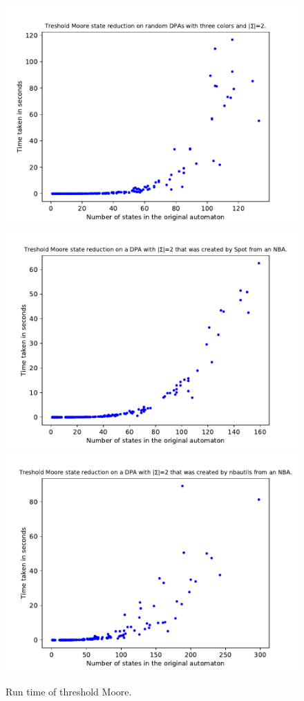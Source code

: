 \begin{figure}
	\centering
	\includegraphics[page=1,height=.3\textheight]{../data/analysis/threshold_moore/gendet_ap1.pdf} 
	\includegraphics[page=1,height=.3\textheight]{../data/analysis/threshold_moore/detspot_ap1.pdf} 
	\includegraphics[page=1,height=.3\textheight]{../data/analysis/threshold_moore/detnbaut_ap1.pdf} 
	\caption{Run time of threshold Moore.}
	\label{exp:fig:threshold_moore_time}
\end{figure}